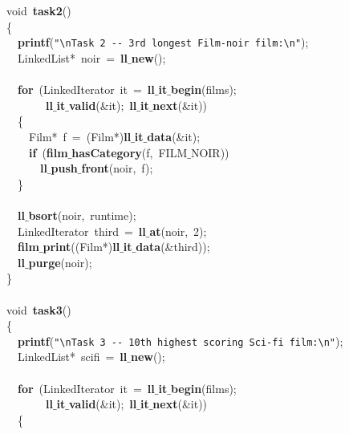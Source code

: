 \documentclass{article}
\begin{document}
\mbox{} \\
\mbox{} \\
\mbox{}void\ \textbf{task2}() \\
\mbox{}\{ \\
\mbox{}\ \ \textbf{printf}(\texttt{"{}}\texttt{\textbackslash{}n}\texttt{Task\ 2\ -\/-\ 3rd\ longest\ Film-noir\ film:}\texttt{\textbackslash{}n}\texttt{"{}}); \\
\mbox{}\ \ LinkedList*\ noir\ =\ \textbf{ll$\_$new}(); \\
\mbox{} \\
\mbox{}\ \ \textbf{for}\ (LinkedIterator\ it\ =\ \textbf{ll$\_$it$\_$begin}(films); \\
\mbox{}\ \ \ \ \ \ \ \textbf{ll$\_$it$\_$valid}(\&it);\ \textbf{ll$\_$it$\_$next}(\&it)) \\
\mbox{}\ \ \{ \\
\mbox{}\ \ \ \ Film*\ f\ =\ (Film*)\textbf{ll$\_$it$\_$data}(\&it); \\
\mbox{}\ \ \ \ \textbf{if}\ (\textbf{film$\_$hasCategory}(f,\ FILM$\_$NOIR)) \\
\mbox{}\ \ \ \ \ \ \textbf{ll$\_$push$\_$front}(noir,\ f); \\
\mbox{}\ \ \} \\
\mbox{} \\
\mbox{}\ \ \textbf{ll$\_$bsort}(noir,\ runtime); \\
\mbox{}\ \ LinkedIterator\ third\ =\ \textbf{ll$\_$at}(noir,\ 2); \\
\mbox{}\ \ \textbf{film$\_$print}((Film*)\textbf{ll$\_$it$\_$data}(\&third)); \\
\mbox{}\ \ \textbf{ll$\_$purge}(noir); \\
\mbox{}\} \\
\mbox{} \\
\mbox{}void\ \textbf{task3}() \\
\mbox{}\{ \\
\mbox{}\ \ \textbf{printf}(\texttt{"{}}\texttt{\textbackslash{}n}\texttt{Task\ 3\ -\/-\ 10th\ highest\ scoring\ Sci-fi\ film:}\texttt{\textbackslash{}n}\texttt{"{}}); \\
\mbox{}\ \ LinkedList*\ scifi\ =\ \textbf{ll$\_$new}(); \\
\mbox{} \\
\mbox{}\ \ \textbf{for}\ (LinkedIterator\ it\ =\ \textbf{ll$\_$it$\_$begin}(films); \\
\mbox{}\ \ \ \ \ \ \ \textbf{ll$\_$it$\_$valid}(\&it);\ \textbf{ll$\_$it$\_$next}(\&it)) \\
\mbox{}\ \ \{ \\
\end{document}
